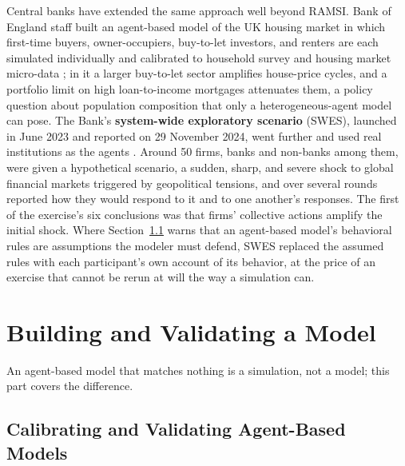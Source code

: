 \documentclass[../ai_in_finance]{subfiles}
\begin{document}
Central banks have extended the same approach well beyond RAMSI. Bank of England staff built an agent-based model of the UK housing market in which first-time buyers, owner-occupiers, buy-to-let investors, and renters are each simulated individually and calibrated to household survey and housing market micro-data \parencite{baptista2016macroprudential}; in it a larger buy-to-let sector amplifies house-price cycles, and a portfolio limit on high loan-to-income mortgages attenuates them, a policy question about population composition that only a heterogeneous-agent model can pose. The Bank's \textbf{system-wide exploratory scenario} (SWES), launched in June 2023 and reported on 29 November 2024, went further and used real institutions as the agents \parencite{boe2024swes}. Around 50 firms, banks and non-banks among them, were given a hypothetical scenario, a sudden, sharp, and severe shock to global financial markets triggered by geopolitical tensions, and over several rounds reported how they would respond to it and to one another's responses. The first of the exercise's six conclusions was that firms' collective actions amplify the initial shock. Where Section~\ref{sec:abm-calibration} warns that an agent-based model's behavioral rules are assumptions the modeler must defend, SWES replaced the assumed rules with each participant's own account of its behavior, at the price of an exercise that cannot be rerun at will the way a simulation can.

\section{Building and Validating a Model}

An agent-based model that matches nothing is a simulation, not a model; this part covers the difference.

\subsection{Calibrating and Validating Agent-Based Models}
\label{sec:abm-calibration}
\end{document}
